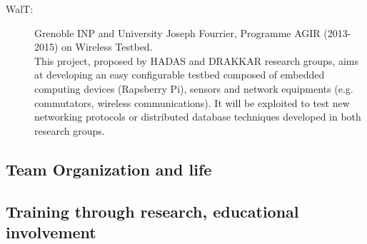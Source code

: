 \begin{description}
\item[WalT:] Grenoble INP and  University Joseph Fourrier, Programme AGIR (2013-2015) on Wireless Testbed. \\
This project, proposed by HADAS and DRAKKAR research groups, aims at developing an easy configurable testbed composed of embedded computing devices (Rapsberry Pi), sensors and network equipments (e.g. commutators, wireless communications). It will be exploited to test new networking protocols or distributed database techniques developed in both research groups.

	
 \end{description}






\subsection{Team Organization and life} %
\label{sub:hadas_team_organization_and_life}%






\subsection{Training through research, educational involvement} %
\label{sub:hadas_training_through_research_educational_involvment}



